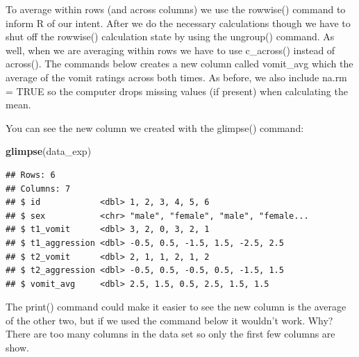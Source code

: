 \documentclass[
]{krantz}
\makeatletter
\newenvironment{Shaded}{\begin{snugshade}}{\end{snugshade}}
\newcommand{\DataTypeTok}[1]{\textcolor[rgb]{0.27,0.27,0.27}{#1}}
\newcommand{\KeywordTok}[1]{\textcolor[rgb]{0.27,0.27,0.27}{\textbf{#1}}}
\newcommand{\NormalTok}[1]{#1}
\newcommand{\OperatorTok}[1]{\textcolor[rgb]{0.43,0.43,0.43}{\textbf{#1}}}
\newcommand{\OtherTok}[1]{\textcolor[rgb]{0.37,0.37,0.37}{#1}}
\newcommand{\StringTok}[1]{\textcolor[rgb]{0.5,0.5,0.5}{#1}}
\newenvironment{kframe}{%
\medskip{}
\setlength{\fboxsep}{.8em}
 \def\at@end@of@kframe{}%
 \ifinner\ifhmode%
  \def\at@end@of@kframe{\end{minipage}}%
  \begin{minipage}{\columnwidth}%
 \fi\fi%
 \def\FrameCommand##1{\hskip\@totalleftmargin \hskip-\fboxsep
 \colorbox{shadecolor}{##1}\hskip-\fboxsep
     \hskip-\linewidth \hskip-\@totalleftmargin \hskip\columnwidth}%
 \MakeFramed {\advance\hsize-\width
   \@totalleftmargin\z@ \linewidth\hsize
   \@setminipage}}%
 {\par\unskip\endMakeFramed%
 \at@end@of@kframe}
\renewenvironment{Shaded}{\begin{kframe}}{\end{kframe}}
\makeatother
\begin{document}
To average within rows (and across columns) we use the rowwise() command to inform R of our intent. After we do the necessary calculations though we have to shut off the rowwise() calculation state by using the ungroup() command. As well, when we are averaging within rows we have to use c\_across() instead of across(). The commands below creates a new column called vomit\_avg which the average of the vomit ratings across both times. As before, we also include na.rm = TRUE so the computer drops missing values (if present) when calculating the mean.

\begin{Shaded}
\end{Shaded}

You can see the new column we created with the glimpse() command:

\begin{Shaded}
\begin{Highlighting}[]
\KeywordTok{glimpse}\NormalTok{(data_exp)}
\end{Highlighting}
\end{Shaded}

\begin{verbatim}
## Rows: 6
## Columns: 7
## $ id            <dbl> 1, 2, 3, 4, 5, 6
## $ sex           <chr> "male", "female", "male", "female...
## $ t1_vomit      <dbl> 3, 2, 0, 3, 2, 1
## $ t1_aggression <dbl> -0.5, 0.5, -1.5, 1.5, -2.5, 2.5
## $ t2_vomit      <dbl> 2, 1, 1, 2, 1, 2
## $ t2_aggression <dbl> -0.5, 0.5, -0.5, 0.5, -1.5, 1.5
## $ vomit_avg     <dbl> 2.5, 1.5, 0.5, 2.5, 1.5, 1.5
\end{verbatim}

The print() command could make it easier to see the new column is the average of the other two, but if we used the command below it wouldn't work. Why? There are too many columns in the data set so only the first few columns are show.
\end{document}
